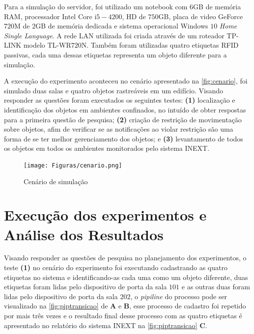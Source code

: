\par
Para a simulação do servidor, foi utilizado um notebook com $6$GB de memória RAM, processador Intel Core i$5-4200$, HD de $750$GB, placa de video GeForce $720$M de $2$GB de memória dedicada e sistema operacional Windows $10$ \textit{Home Single Language}. A rede LAN utilizada foi criada através de um roteador TP-LINK modelo TL-WR$720$N. Também foram utilizadas quatro etiquetas RFID passivas, cada uma dessas etiquetas representa um objeto diferente para a simulação.


\par
A execução do experimento aconteceu no cenário apresentado na \autoref{fig:cenario}, foi simulado duas salas e quatro objetos rastreáveis em um edifício. Visando responder as questões foram executados os seguintes testes: 
\textbf{(1)} localização e identificação dos objetos em ambientes confinados, no intuído de obter respostas para a primeira questão de pesquisa; 
\textbf{(2)} criação de restrição de movimentação sobre objetos, afim de verificar se as notificações ao violar restrição são uma forma de se ter melhor gerenciamento dos objetos; e 
\textbf{(3)} levantamento de todos os objetos em todos os ambientes monitorados pelo sistema INEXT.

\begin{figure}[H]
              \caption{\label{fig:cenario}{Cenário de simulação}}
              \centering
              \texttt{[image: Figuras/cenario.png]}
\end{figure}

\section{Execução dos experimentos e Análise dos Resultados}

Visando responder as questões de pesquisa no planejamento dos experimentos, o teste \textbf{(1)} no cenário do experimento foi executando  cadastrando as quatro etiquetas no sistema e identificando-as cada uma como um objeto diferente, duas etiquetas foram lidas pelo dispositivo de porta da sala $101$ e as outras duas foram lidas pelo dispositivo de porta da sala $202$, o \textit{pipiline} do processo pode ser visualizado na \autoref{fig:piptransicao} de \textbf{A} e \textbf{B}, esse processo de cadastro foi repetido por mais três vezes e o resultado final desse processo com as quatro etiquetas é apresentado no relatório do sistema INEXT na \autoref{fig:piptransicao} \textbf{C}.

